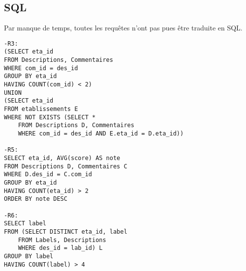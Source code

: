 \subsection{SQL}
\noindent Par manque de temps, toutes les requêtes n'ont pas pues être traduite en SQL.
\begin{verbatim}
-R3:
(SELECT eta_id
FROM Descriptions, Commentaires
WHERE com_id = des_id
GROUP BY eta_id
HAVING COUNT(com_id) < 2)
UNION
(SELECT eta_id
FROM etablissements E
WHERE NOT EXISTS (SELECT *
    FROM Descriptions D, Commentaires
    WHERE com_id = des_id AND E.eta_id = D.eta_id))
    
-R5:
SELECT eta_id, AVG(score) AS note
FROM Descriptions D, Commentaires C
WHERE D.des_id = C.com_id
GROUP BY eta_id
HAVING COUNT(eta_id) > 2
ORDER BY note DESC

-R6:
SELECT label
FROM (SELECT DISTINCT eta_id, label
    FROM Labels, Descriptions
    WHERE des_id = lab_id) L
GROUP BY label
HAVING COUNT(label) > 4
\end{verbatim}
